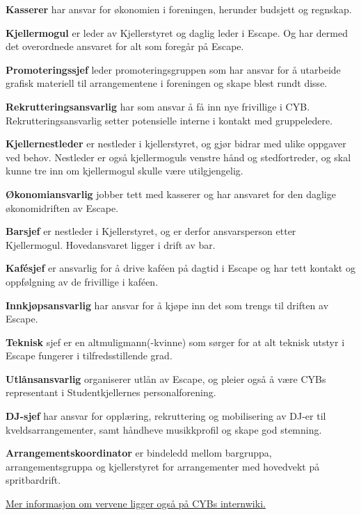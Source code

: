 \documentclass[12pt, norsk, a4paper]{proc}
\begin{document}
\textbf{Kasserer} har ansvar for økonomien i foreningen, herunder
budsjett og regnskap.

\textbf{Kjellermogul} er leder av Kjellerstyret og daglig leder i
Escape. Og har dermed det overordnede ansvaret for alt som foregår på
Escape.

\textbf{Promoteringssjef} leder promoteringsgruppen som har ansvar for å
utarbeide grafisk materiell til arrangementene i foreningen og skape
blest rundt disse.

\textbf{Rekrutteringsansvarlig} har som ansvar å få inn nye frivillige i
CYB. Rekrutteringsansvarlig setter potensielle interne i kontakt med
gruppeledere.

\textbf{Kjellernestleder} er nestleder i kjellerstyret, og gjør bidrar
med ulike oppgaver ved behov. Nestleder er også kjellermoguls venstre
hånd og stedfortreder, og skal kunne tre inn om kjellermogul skulle være
utilgjengelig.

\textbf{Økonomiansvarlig} jobber tett med kasserer og har ansvaret for
den daglige økonomidriften av Escape.

\textbf{Barsjef} er nestleder i Kjellerstyret, og er derfor
ansvarsperson etter Kjellermogul. Hovedansvaret ligger i drift av bar.

\textbf{Kafésjef} er ansvarlig for å drive kaféen på dagtid i Escape og
har tett kontakt og oppfølgning av de frivillige i kaféen.

\textbf{Innkjøpsansvarlig} har ansvar for å kjøpe inn det som trengs til
driften av Escape.

\textbf{Teknisk} sjef er en altmuligmann(-kvinne) som sørger for at alt
teknisk utstyr i Escape fungerer i tilfredsstillende grad.

\textbf{Utlånsansvarlig} organiserer utlån av Escape, og pleier også å
være CYBs representant i Studentkjellernes personalforening.

\textbf{DJ-sjef} har ansvar for opplæring, rekruttering og mobilisering
av DJ-er til kveldsarrangementer, samt håndheve musikkprofil og skape
god stemning.

\textbf{Arrangementskoordinator} er bindeledd mellom bargruppa,
arrangementsgruppa og kjellerstyret for arrangementer med hovedvekt på
spritbardrift.

\href{https://wiki.cyb.no/display/AKTIV/Vervoversikt}{Mer informasjon om vervene ligger også på CYBs internwiki.}
\end{document}
